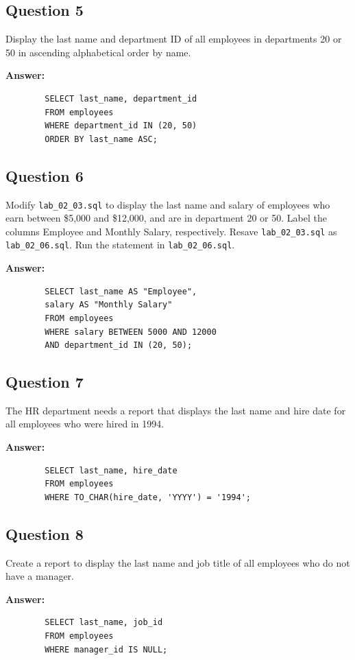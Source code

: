 \documentclass[12pt,a4paper]{article}
\begin{document}
\subsection*{Question 5}
Display the last name and department ID of all employees in departments 20 or 50 in ascending 
alphabetical order by name.

\textbf{Answer:}
    \begin{lstlisting}
        SELECT last_name, department_id
        FROM employees
        WHERE department_id IN (20, 50)
        ORDER BY last_name ASC;
    \end{lstlisting}

\subsection*{Question 6}
Modify \texttt{lab\_02\_03.sql} to display the last name and salary of employees who earn between 
\$5,000 and \$12,000, and are in department 20 or 50. Label the columns Employee and 
Monthly Salary, respectively. Resave \texttt{lab\_02\_03.sql} as \texttt{lab\_02\_06.sql}. Run the 
statement in \texttt{lab\_02\_06.sql}.

\textbf{Answer:}
    \begin{lstlisting}
        SELECT last_name AS "Employee",
        salary AS "Monthly Salary"
        FROM employees
        WHERE salary BETWEEN 5000 AND 12000
        AND department_id IN (20, 50);
    \end{lstlisting}

\subsection*{Question 7}
The HR department needs a report that displays the last name and hire date for all employees 
who were hired in 1994.

\textbf{Answer:}
    \begin{lstlisting}
        SELECT last_name, hire_date
        FROM employees
        WHERE TO_CHAR(hire_date, 'YYYY') = '1994';
    \end{lstlisting}

\subsection*{Question 8}
Create a report to display the last name and job title of all employees who do not have a 
manager.

\textbf{Answer:}
    \begin{lstlisting}
        SELECT last_name, job_id
        FROM employees
        WHERE manager_id IS NULL;
    \end{lstlisting}
\end{document}
